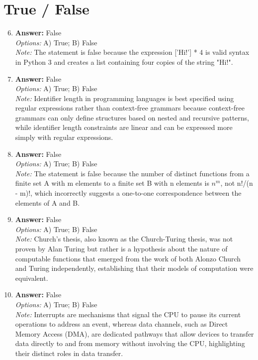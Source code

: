 \documentclass[12pt]{article}
\begin{document}
\section*{True / False}
\begin{enumerate}[label=\arabic*.]
\setcounter{enumi}{5}
\item \textbf{Answer:} False
\\ \textit{Options:} A) True; B) False
\\ \textit{Note:} The statement is false because the expression ['Hi!'] * 4 is valid syntax in Python 3 and creates a list containing four copies of the string "Hi!".
\item \textbf{Answer:} False
\\ \textit{Options:} A) True; B) False
\\ \textit{Note:} Identifier length in programming languages is best specified using regular expressions rather than context-free grammars because context-free grammars can only define structures based on nested and recursive patterns, while identifier length constraints are linear and can be expressed more simply with regular expressions.
\item \textbf{Answer:} False
\\ \textit{Options:} A) True; B) False
\\ \textit{Note:} The statement is false because the number of distinct functions from a finite set A with m elements to a finite set B with n elements is $n^m$, not n!/(n - m)!, which incorrectly suggests a one-to-one correspondence between the elements of A and B.
\item \textbf{Answer:} False
\\ \textit{Options:} A) True; B) False
\\ \textit{Note:} Church's thesis, also known as the Church-Turing thesis, was not proven by Alan Turing but rather is a hypothesis about the nature of computable functions that emerged from the work of both Alonzo Church and Turing independently, establishing that their models of computation were equivalent.
\item \textbf{Answer:} False
\\ \textit{Options:} A) True; B) False
\\ \textit{Note:} Interrupts are mechanisms that signal the CPU to pause its current operations to address an event, whereas data channels, such as Direct Memory Access (DMA), are dedicated pathways that allow devices to transfer data directly to and from memory without involving the CPU, highlighting their distinct roles in data transfer.
\end{enumerate}
\end{document}
